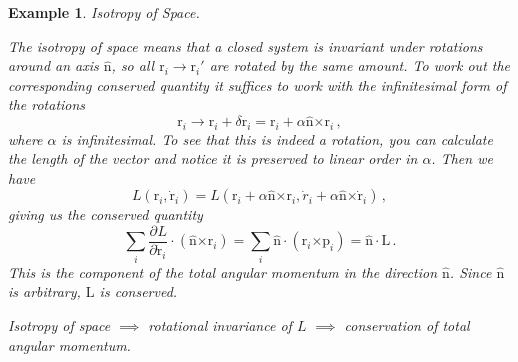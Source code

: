 \documentclass{article}
\theoremstyle{plain}\theoremheaderfont{\normalfont\itshape}\theorembodyfont{\rmfamily}\theoremseparator{.}\newtheorem*{rem}{Remark}\newtheorem*{ex}{Example}\newtheorem*{proof}{Proof}\newtheorem*{altp}{Alternative proof}
\theoremstyle{plain}\theoremheaderfont{\normalfont\bfseries}\theorembodyfont{\rmfamily}\theoremseparator{.}\newtheorem{thm}{Theorem}[section]\newtheorem{lem}[thm]{Lemma}\newtheorem{prop}[thm]{Proposition}\newtheorem*{cor}{Corollary}\newtheorem{defn}[thm]{Definition}\newtheorem{clm}[thm]{Claim}\newtheorem{clminproof}{Claim}\newtheorem*{law}{Law}\newtheorem{pos}[thm]{Postulate}
\theoremstyle{break}\theoremheaderfont{\normalfont\itshape}\theorembodyfont{\rmfamily}\theoremseparator{.\medskip}\newtheorem*{proofskip}{Proof}\newtheorem*{exs}{Examples}\newtheorem*{rems}{Remarks}
\theoremstyle{break}\theoremheaderfont{\normalfont\bfseries}\theorembodyfont{\rmfamily}\theoremseparator{.\medskip}\newtheorem{lemskip}[thm]{Lemma}\newtheorem{defnskip}[thm]{Definition}\newtheorem{propskip}[thm]{Proposition}\newtheorem{thmskip}[thm]{Theorem}
\numberwithin{equation}{section}
\newcommand{\pdv}[3][]{\frac{\partial^{#1} #2}{{\partial #3}^{#1}}}
\newcommand{\vb}[1]{\bm{\mathrm{#1}}}
\newcommand{\vu}[1]{\hat{\bm{\mathrm{#1}}}}
\newcommand{\vdot}{\,\bm{\mathrm{\cdot}}\,}
\newcommand{\cross}{\bm{\mathrm{\times}}}
\begin{document}
    \begin{ex}
        \textit{Isotropy of Space}.

        The isotropy of space means that a closed system is invariant under rotations around an axis \(\vu{n}\), so all \(\vb{r}_i\to\vb{r}_i'\) are rotated by the same amount. To work out the corresponding conserved quantity it suffices to work with the infinitesimal form of the rotations
        \begin{equation}
            \vb{r}_i\longrightarrow \vb{r}_i+\delta\vb{r}_i=\vb{r}_i+\alpha\vu{n}\cross\vb{r}_i\,,
        \end{equation}
        where \(\alpha\) is infinitesimal. To see that this is indeed a rotation, you can calculate the length of the vector and notice it is preserved to linear order in \(\alpha\). Then we have
        \begin{equation}
            L(\vb{r}_i,\dot{\vb{r}}_i)=L(\vb{r}_i+\alpha\vu{n}\cross\vb{r}_i,\dot{r}_i+\alpha\vu{n}\cross\dot{\vb{r}}_i)\,,
        \end{equation}
        giving us the conserved quantity
        \begin{equation}
            \sum_i\pdv{L}{\dot{\vb{r}}_i}\vdot(\vu{n}\cross\vb{r}_i)=\sum_i\vu{n}\vdot(\vb{r}_i\cross\vb{p}_i)=\vu{n}\vdot\vb{L}\,.
        \end{equation}
        This is the component of the total angular momentum in the direction \(\vu{n}\). Since \(\vu{n}\) is arbitrary, \(\vb{L}\) is conserved.

        Isotropy of space \(\implies\) rotational invariance of \(L\) \(\implies\) conservation of total angular momentum.
    \end{ex}
\end{document}
